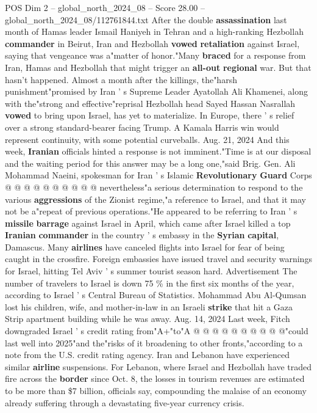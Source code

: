 \begin{textsample}{POS Dim 2 – global\_north\_2024\_08 – Score 28.00 – global\_north\_2024\_08/112761844.txt}  \label{ex:f2_pos_090}
After the double \textbf{assassination} last month of Hamas leader Ismail Haniyeh in Tehran and a high-ranking Hezbollah \textbf{commander} in Beirut, Iran and Hezbollah \textbf{vowed} \textbf{retaliation} against Israel, saying that vengeance was a"matter of honor."Many \textbf{braced} for a response from Iran, Hamas and Hezbollah that might trigger an \textbf{all-out} \textbf{regional} war.
But that hasn't happened.
Almost a month after the killings, the"harsh punishment"promised by Iran ' s Supreme Leader Ayatollah Ali Khamenei, along with the"strong and effective"reprisal Hezbollah head Sayed Hassan Nasrallah \textbf{vowed} to bring upon Israel, has yet to materialize.
In Europe, there ' s relief over a strong standard-bearer facing Trump.
A Kamala Harris win would represent continuity, with some potential curveballs.
Aug. 21, 2024 And this week, \textbf{Iranian} officials hinted a response is not imminent."Time is at our disposal and the waiting period for this answer may be a long one,"said Brig.
Gen.
Ali Mohammad Naeini, spokesman for Iran ' s Islamic \textbf{Revolutionary} \textbf{Guard} Corps @ @ @ @ @ @ @ @ @ @ nevertheless"a serious determination to respond to the various \textbf{aggressions} of the Zionist regime,"a reference to Israel, and that it may not be a"repeat of previous operations."He appeared to be referring to Iran ' s \textbf{missile} \textbf{barrage} against Israel in April, which came after Israel killed a top \textbf{Iranian} \textbf{commander} in the country ' s embassy in the \textbf{Syrian} \textbf{capital}, Damascus.
Many \textbf{airlines} have canceled flights into Israel for fear of being caught in the crossfire.
Foreign embassies have issued travel and security warnings for Israel, hitting Tel Aviv ' s summer tourist season hard.
Advertisement The number of travelers to Israel is down 75 \% in the first six months of the year, according to Israel ' s Central Bureau of Statistics.
Mohammad Abu Al-Qumsan lost his children, wife, and mother-in-law in an Israeli \textbf{strike} that hit a Gaza Strip apartment building while he was away.
Aug. 14, 2024 Last week, Fitch downgraded Israel ' s credit rating from"A+"to"A @ @ @ @ @ @ @ @ @ @"could last well into 2025"and the"risks of it broadening to other fronts,"according to a note from the U.S. credit rating agency.
Iran and Lebanon have experienced similar \textbf{airline} suspensions.
For Lebanon, where Israel and Hezbollah have traded fire across the \textbf{border} since Oct. 8, the losses in tourism revenues are estimated to be more than \$7 billion, officials say, compounding the malaise of an economy already suffering through a devastating five-year currency crisis.

\end{textsample}
